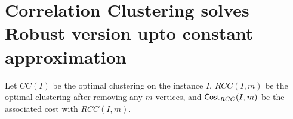 \section{Correlation Clustering solves Robust version upto constant approximation}

Let $CC(I)$ be the optimal clustering on the instance $I$, $RCC(I,m)$ be the optimal clustering after removing any $m$ vertices, and $\mathsf{Cost}_{RCC}(I,m)$ be the associated cost with $RCC(I,m)$. 


